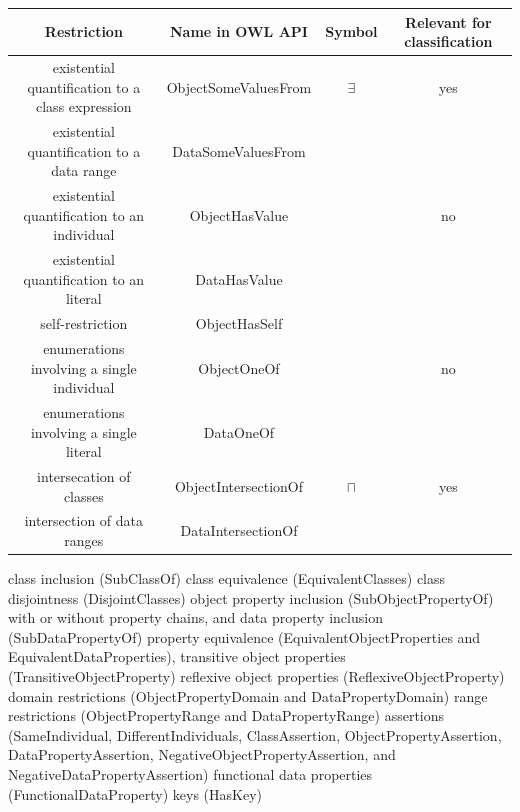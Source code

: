 \documentclass[a4paper]{article}
\begin{document}
\begin{center}
	\begin{tabular}{|c | c | c | c|} 
		\hline
		Restriction                                      & Name in OWL API      & Symbol        & Relevant for classification   \\
		\hline\hline
		existential quantification to a class expression & ObjectSomeValuesFrom & $\exists$     & yes                           \\ 
		\hline
		existential quantification to a data range       & DataSomeValuesFrom   &               &                               \\
		\hline
		existential quantification to an individual      & ObjectHasValue       &               & no                            \\
		\hline
		existential quantification to an literal         & DataHasValue         &               &                               \\
		\hline
		self-restriction                                 & ObjectHasSelf        &               &                               \\
		\hline
		enumerations involving a single individual       & ObjectOneOf          &               & no                            \\
		\hline
		enumerations involving a single literal          & DataOneOf            &               &                               \\
		\hline
		intersecation of classes                         & ObjectIntersectionOf & $\sqcap$      & yes                           \\
		\hline
		intersection of data ranges                      & DataIntersectionOf   &               &                               \\
		\hline
	\end{tabular}
\end{center}


     class inclusion (SubClassOf)
    class equivalence (EquivalentClasses)
    class disjointness (DisjointClasses)
    object property inclusion (SubObjectPropertyOf) with or without property chains, and data property inclusion (SubDataPropertyOf)
    property equivalence (EquivalentObjectProperties and EquivalentDataProperties),
    transitive object properties (TransitiveObjectProperty)
    reflexive object properties (ReflexiveObjectProperty)
    domain restrictions (ObjectPropertyDomain and DataPropertyDomain)
    range restrictions (ObjectPropertyRange and DataPropertyRange)
    assertions (SameIndividual, DifferentIndividuals, ClassAssertion, ObjectPropertyAssertion, DataPropertyAssertion, NegativeObjectPropertyAssertion, and NegativeDataPropertyAssertion)
    functional data properties (FunctionalDataProperty)
    keys (HasKey) 
\end{document}
